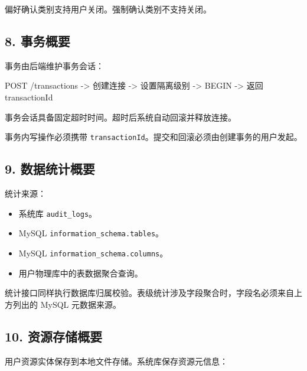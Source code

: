 \documentclass[
  a4paper,
  UTF8]{ctexart}
\newenvironment{Shaded}{}{}
\newcommand{\NormalTok}[1]{#1}
\providecommand{\tightlist}{%
  \setlength{\itemsep}{0pt}\setlength{\parskip}{0pt}}
\begin{document}
偏好确认类别支持用户关闭。强制确认类别不支持关闭。

\hypertarget{ux4e8bux52a1ux6982ux8981}{%
\subsection{8. 事务概要}\label{ux4e8bux52a1ux6982ux8981}}

事务由后端维护事务会话：

\begin{Shaded}
\begin{Highlighting}[]
\NormalTok{POST /transactions}
\NormalTok{  {-}\textgreater{} 创建连接}
\NormalTok{  {-}\textgreater{} 设置隔离级别}
\NormalTok{  {-}\textgreater{} BEGIN}
\NormalTok{  {-}\textgreater{} 返回 transactionId}
\end{Highlighting}
\end{Shaded}

事务会话具备固定超时时间。超时后系统自动回滚并释放连接。

事务内写操作必须携带
\texttt{transactionId}。提交和回滚必须由创建事务的用户发起。

\hypertarget{ux6570ux636eux7edfux8ba1ux6982ux8981}{%
\subsection{9.
数据统计概要}\label{ux6570ux636eux7edfux8ba1ux6982ux8981}}

统计来源：

\begin{itemize}
\tightlist
\item
  系统库 \texttt{audit\_logs}。
\item
  MySQL \texttt{information\_schema.tables}。
\item
  MySQL \texttt{information\_schema.columns}。
\item
  用户物理库中的表数据聚合查询。
\end{itemize}

统计接口同样执行数据库归属校验。表级统计涉及字段聚合时，字段名必须来自上方列出的
MySQL 元数据来源。

\hypertarget{ux8d44ux6e90ux5b58ux50a8ux6982ux8981}{%
\subsection{10.
资源存储概要}\label{ux8d44ux6e90ux5b58ux50a8ux6982ux8981}}

用户资源实体保存到本地文件存储。系统库保存资源元信息：
\end{document}

